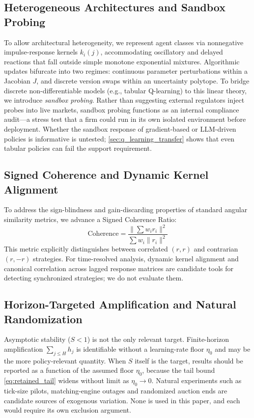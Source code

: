 \documentclass[10pt,twocolumn,letterpaper]{article}
\theoremstyle{definition}
\theoremstyle{remark}
\begin{document}
\subsection{Heterogeneous Architectures and Sandbox Probing}
To allow architectural heterogeneity, we represent agent classes via nonnegative impulse-response kernels $k_i(j)$, accommodating oscillatory and delayed reactions that fall outside simple monotone exponential mixtures. Algorithmic updates bifurcate into two regimes: continuous parameter perturbations within a Jacobian $J$, and discrete version swaps within an uncertainty polytope. To bridge discrete non-differentiable models (e.g., tabular Q-learning) to this linear theory, we introduce \textit{sandbox probing}. Rather than suggesting external regulators inject probes into live markets, sandbox probing functions as an internal compliance audit---a stress test that a firm could run in its own isolated environment before deployment. Whether the sandbox response of gradient-based or LLM-driven policies is informative is untested; \cref{sec:q_learning_transfer} shows that even tabular policies can fail the support requirement.

\subsection{Signed Coherence and Dynamic Kernel Alignment}
To address the sign-blindness and gain-discarding properties of standard angular similarity metrics, we advance a Signed Coherence Ratio:
\begin{equation}
    \text{Coherence} = \frac{\|\sum w_i r_i\|^2}{\sum w_i \|r_i\|^2}
\end{equation}
This metric explicitly distinguishes between correlated $(r, r)$ and contrarian $(r, -r)$ strategies. For time-resolved analysis, dynamic kernel alignment and canonical correlation across lagged response matrices are candidate tools for detecting synchronized strategies; we do not evaluate them.

\subsection{Horizon-Targeted Amplification and Natural Randomization}\label{sec:natural_randomization}
Asymptotic stability ($S<1$) is not the only relevant target. Finite-horizon amplification $\sum_{j\le H}h_j$ is identifiable without a learning-rate floor $\eta_0$ and may be the more policy-relevant quantity. When $S$ itself is the target, results should be reported as a function of the assumed floor $\eta_0$, because the tail bound \eqref{eq:retained_tail} widens without limit as $\eta_0\to0$. Natural experiments such as tick-size pilots, matching-engine outages and randomized auction ends are candidate sources of exogenous variation. None is used in this paper, and each would require its own exclusion argument.
\end{document}
